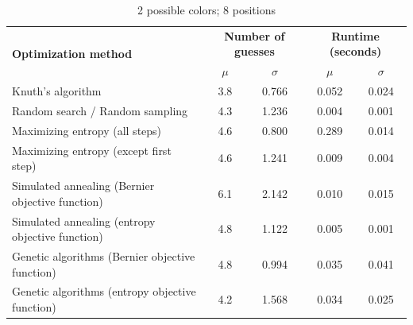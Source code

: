 \documentclass[11pt]{article}
\begin{document}
\begin{table}[h!]
\begin{center}
\begin{tabular}{l c c c c}
\toprule
\multirow{2}{*}{\bfseries Optimization method} 		& \multicolumn{2}{c}{\bfseries Number of guesses} 		& \multicolumn{2}{c}{\bfseries Runtime (seconds)}	\\
\cmidrule(lr){2-3}  \cmidrule(lr){4-5}				& $\mu$ & $\sigma$								& $\mu$ & $\sigma$							\\
\cmidrule(lr){1-5}
Knuth's algorithm							& 3.8 & 0.766									& 0.052 & 0.024							\\
Random search / Random sampling				& 4.3 & 1.236									& 0.004 & 0.001							\\
Maximizing entropy (all steps)					& 4.6 & 0.800									& 0.289 & 0.014							\\
Maximizing entropy (except first step)			& 4.6 & 1.241									& 0.009 & 0.004							\\
Simulated annealing (Bernier objective function)	& 6.1 & 2.142									& 0.010 & 0.015							\\
Simulated annealing (entropy objective function)	& 4.8 & 1.122									& 0.005 & 0.001							\\
Genetic algorithms (Bernier objective function)		& 4.8 & 0.994									& 0.035 & 0.041							\\
Genetic algorithms (entropy objective function)		& 4.2 & 1.568									& 0.034 & 0.025							\\
\bottomrule
\end{tabular}
\end{center}
\caption{2 possible colors; 8 positions}
\label{fig:compare_2_8}
\end{table}
\end{document}
